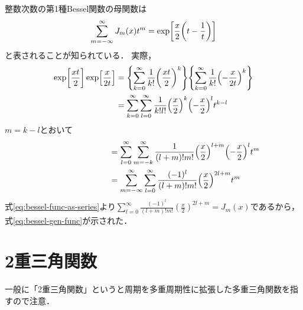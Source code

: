 \documentclass[dvipdfmx,autodetect-engine,12pt,fleqn]{jsarticle}
\begin{document}
整数次数の第1種Bessel関数の母関数は
\begin{equation}
\label{eq:bessel-gen-func}
    \sum_{m=-\infty}^\infty J_m(x)t^m = \exp\sbra*{\frac{x}{2}\qty(t-\frac{1}{t})}
\end{equation}
と表されることが知られている．
実際，
\begin{equation}
\begin{split}
    \exp\sbra*{\frac{x t}{2}}\exp\sbra*{\frac{x}{2t}}
    &=\qty{\sum_{k=0}^\infty \frac{1}{k!}\qty(\frac{x t}{2})^k} \qty{\sum_{k=0}^\infty \frac{1}{k!}\qty(-\frac{x}{2t})^k}\\
    &=\sum_{k=0}^\infty \sum_{l=0}^\infty \frac{1}{k! l!}\qty(\frac{x}{2})^k \qty(-\frac{x}{2})^l t^{k-l}
\end{split} 
\end{equation}
$m=k-l$とおいて
\begin{equation}
\begin{split}
    \phantom{\exp\sbra*{\frac{x t}{2}}\exp\sbra*{\frac{x}{2t}}}
    &=\sum_{l=0}^\infty \sum_{m=-k}^\infty \frac{1}{(l+m)! m!}\qty(\frac{x}{2})^{l+m} \qty(-\frac{x}{2})^l t^m\\
    &=\sum_{m=-\infty}^\infty \sum_{l=0}^\infty \frac{(-1)^l}{(l+m)! m!}\qty(\frac{x}{2})^{2l+m} t^m
\end{split} 
\end{equation}
式\eqref{eq:bessel-func-as-series}より$\sum_{l=0}^\infty \frac{(-1)^l}{(l+m)! m!}(\frac{x}{2})^{2l+m} = J_m(x)$であるから，式\eqref{eq:bessel-gen-func}が示された．

\section{2重三角関数}
\textreferencemark 一般に「2重三角関数」というと周期を多重周期性に拡張した多重三角関数を指すので注意．
\end{document}

